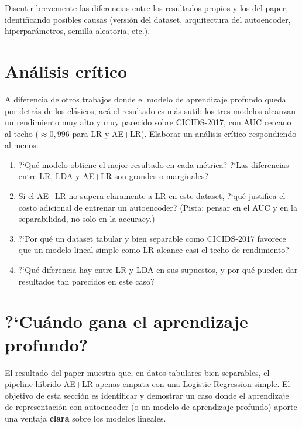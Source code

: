 \documentclass[11pt,a4paper]{article}
\begin{document}
Discutir brevemente las diferencias entre los resultados propios y los del paper, identificando posibles causas (versi\'on del dataset, arquitectura del autoencoder, hiperpar\'ametros, semilla aleatoria, etc.).

\section{An\'alisis cr\'itico}
A diferencia de otros trabajos donde el modelo de aprendizaje profundo queda por detr\'as de los cl\'asicos, ac\'a el resultado es m\'as sutil: los tres modelos alcanzan un rendimiento muy alto y muy parecido sobre CICIDS-2017, con AUC cercano al techo ($\approx 0,996$ para LR y AE+LR). Elaborar un an\'alisis cr\'itico respondiendo al menos:
\begin{enumerate}[leftmargin=2em,itemsep=2pt]
    \item ?`Qu\'e modelo obtiene el mejor resultado en cada m\'etrica? ?`Las diferencias entre LR, LDA y AE+LR son grandes o marginales?
    \item Si el AE+LR no supera claramente a LR en este dataset, ?`qu\'e justifica el costo adicional de entrenar un autoencoder? (Pista: pensar en el AUC y en la separabilidad, no solo en la accuracy.)
    \item ?`Por qu\'e un dataset tabular y bien separable como CICIDS-2017 favorece que un modelo lineal simple como LR alcance casi el techo de rendimiento?
    \item ?`Qu\'e diferencia hay entre LR y LDA en sus supuestos, y por qu\'e pueden dar resultados tan parecidos en este caso?
\end{enumerate}

\section{?`Cu\'ando gana el aprendizaje profundo?}
El resultado del paper muestra que, en datos tabulares bien separables, el pipeline h\'ibrido AE+LR apenas empata con una Logistic Regression simple. El objetivo de esta secci\'on es identificar y demostrar un caso donde el aprendizaje de representaci\'on con autoencoder (o un modelo de aprendizaje profundo) aporte una ventaja \textbf{clara} sobre los modelos lineales.
\end{document}
